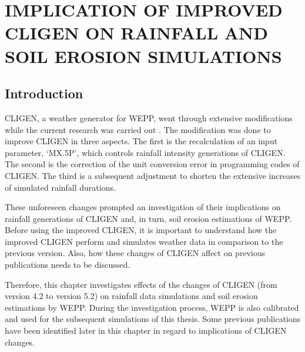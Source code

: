\chapter{IMPLICATION OF IMPROVED CLIGEN ON RAINFALL AND SOIL EROSION
SIMULATIONS}
\label{sec:IMPLICATIONSOFIMPROVEDCLIGEN}

\section{Introduction}
\label{sec:ImprovedCligenIntroduction}
CLIGEN, a weather generator for WEPP, went through extensive modifications while
the current research was carried out \citep{yu2000-301}. The modification was
done to improve CLIGEN in three aspects. The first is the recalculation of an
input parameter, `{MX.5P}', which controls rainfall intensity generations of
CLIGEN. The second is the correction of the unit conversion error in programming
codes of CLIGEN. The third is a subsequent adjustment to shorten the extensive
increases of simulated rainfall durations.

These unforeseen changes prompted an investigation of their implications on
rainfall generations of CLIGEN and, in turn, soil erosion estimations of WEPP.
Before using the improved CLIGEN, it is important to understand how the improved
CLIGEN perform and simulates weather data in comparison to the previous version.
Also, how these changes of CLIGEN affect on previous publications needs to be
discussed.

Therefore, this chapter investigates effects of the changes of CLIGEN (from
version 4.2 to version 5.2) on rainfall data simulations and soil erosion
estimations by WEPP. During the investigation process, WEPP is also calibrated
and used for the subsequent simulations of this thesis. Some previous
publications have been identified later in this chapter in regard to
implications of CLIGEN changes.


